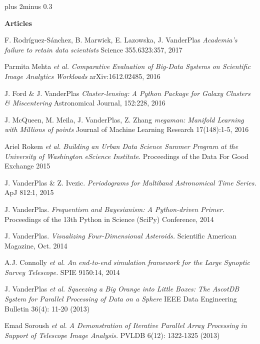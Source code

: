 \documentclass{article} %
\def\bf{\bfseries}
\def\sf{\sffamily}
\newlength\sidebarwidth
\newcommand{\smalltopic}[2]%
	 {\pagebreak[2]%
	 \vskip 1\baselineskip plus 2\baselineskip minus 0.3\baselineskip
	 \begin{minipage}{\textwidth}
         \phantomsection\addcontentsline{toc}{subsection}{#1}%
         \nopagebreak\hspace{0in}%
         \nopagebreak\begin{minipage}[t]{\sidebarwidth - .2cm}
         \raggedleft \bf\sf %
	 \textcolor{dark_blue}{\large #1}%
	 \end{minipage}%
	 \hfill
	 \begin{minipage}[t]{\linewidth - \sidebarwidth}
	 \nopagebreak{%
	    \rule{\linewidth}{.5pt}%
	    \vspace{.1\baselineskip}%
	    }%
	    #2
	 \end{minipage}
	 \end{minipage}}
\begin{document}
\smalltopic{\hspace*{-3ex} Articles}{
  \begin{itemize}[leftmargin=0ex, itemsep=0ex, parsep=.5ex, labelindent=-4ex]

    \publication
          F. Rodríguez-Sánchez, B. Marwick, E. Lazowska, J. VanderPlas
          {\it Academia's failure to retain data scientists}
          Science 355.6323:357, 2017

    \publication
          Parmita Mehta {\it et al.}
          {\it Comparative Evaluation of Big-Data Systems on Scientific Image Analytics Workloads}
          arXiv:1612.02485, 2016

    \publication
	  J. Ford \& J. VanderPlas
	  {\it Cluster-lensing: A Python Package for Galaxy Clusters \& Miscentering}
	  Astronomical Journal, 152:228, 2016

    \publication
      J. McQueen, M. Meila, J. VanderPlas, Z. Zhang
      {\it megaman: Manifold Learning with Millions of points}
      Journal of Machine Learning Research 17(148):1-5, 2016

    \publication
      Ariel Rokem {\it et al.}
      {\it Building an Urban Data Science Summer Program at the University of Washington eScience Institute}.
      Proceedings of the Data For Good Exchange 2015

    \publication
      J. VanderPlas \& Z. Ivezic.
      {\it Periodograms for Multiband Astronomical Time Series.}
      ApJ 812:1, 2015

    \publication
      J. VanderPlas.
      {\it Frequentism and Bayesianism: A Python-driven Primer.}
      Proceedings of the 13th Python in Science (SciPy) Conference, 2014

    \publication
      J. VanderPlas.
      {\it Visualizing Four-Dimensional Asteroids.}
      Scientific American Magazine, Oct. 2014

    \publication
      A.J. Connolly {\it et al.}
      {\it An end-to-end simulation framework for the Large Synoptic Survey Telescope.}
      SPIE 9150:14, 2014

    \publication
      J. VanderPlas {\it et al.}
      {\it Squeezing a Big Orange into Little Boxes: The AscotDB System
        for Parallel Processing of Data on a Sphere}
      IEEE Data Engineering Bulletin 36(4): 11-20 (2013)

    \publication
      Emad Soroush {\it et al.}
      {\it A Demonstration of Iterative Parallel Array Processing in Support
        of Telescope Image Analysis.}
      PVLDB 6(12): 1322-1325 (2013)


\end{itemize}}
\end{document}
